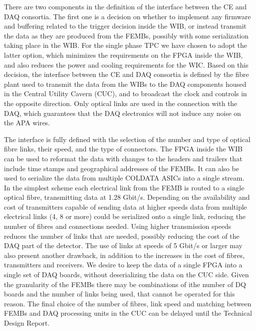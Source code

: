 There are two components in the definition of the interface between the CE
and DAQ consortia. The first one is a decision on whether to implement any
firmware and buffering related to the trigger decision inside the WIB, or
instead transmit the data as they are produced from the FEMBs, possibly with
some serialization taking place in the WIB. For the single phase TPC we have
chosen to adopt the latter option, which minimizes the requirements on the
FPGA inside the WIB, and also reduces the power and cooling requirements for the WIC.
Based on this decision, the interface between the CE and DAQ consortia is
defined by the fibre plant
used to transmit the data from the WIBs to the DAQ components housed in the
Central Utility Cavern (CUC), and to broadcast the clock and controls in the
opposite direction. Only optical links are used in the connection with the DAQ,
which guarantees that the DAQ electronics will not induce any noise on the
APA wires.

The interface is fully defined with the selection of the number
and type of optical fibre links, their speed, and the type of connectors.
The FPGA inside the WIB can be used to reformat the data with changes to
the headers and trailers that include time stamps and geographical addresses
of the FEMBs. It can also be used to serialize the data from multiple
COLDATA ASICs into a single stream. In the simplest scheme each electrical
link from the FEMB is routed to a single optical fibre, transmitting data
at 1.28 Gbit/s. Depending on the availability and cost of transmitters
capable of sending data at higher speeds data from multiple electrical
links (4, 8 or more) could be serialized onto a single link, reducing the
number of fibres and connections needed. Using higher transmission
speeds reduces the number of links that are needed, possibly reducing the
cost of the DAQ part of the detector. The use of links at speeds of 5 Gbit/s
or larger may also present another drawback, in addition to the increases
in the cost of fibres, transmitters and receivers. We desire to keep the
data of a single FPGA into a single set of DAQ boards, without deserializing
the data on the CUC side. Given the granularity of the FEMBs there may be
combinations of ithe number of DQ boards and the number of links being
used, that cannot be operated for this reason. The final choice of the
number of fibres, link speed and matching between FEMBs and DAQ processing
units in the CUC can be delayed until the Technical Design Report.

